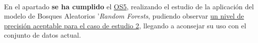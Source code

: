 \paragraph{}
En el apartado  \textbf{se ha cumplido} el \hyperref[os:OS5]{OS5}, realizando el estudio de la aplicación del modelo de Bosques Aleatorios '\textit{Random Forests}, pudiendo observar \hyperref[resultados:rf]{un nivel de precisión aceptable para el caso de estudio 2}, llegando a aconsejar su uso con el conjunto de datos actual.